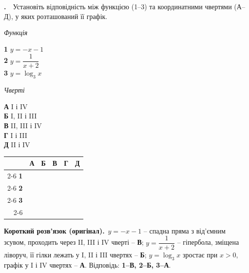 \documentclass[12pt]{article}
\newcommand{\matchingGrid}{%
    \begingroup
    \renewcommand{\arraystretch}{1.15}
    \setlength{\tabcolsep}{4pt}
    \footnotesize
    \begin{tabular}{r|c|c|c|c|c|}
         \multicolumn{1}{c}{} & \multicolumn{1}{c}{\textbf{А}} & \multicolumn{1}{c}{\textbf{Б}} & \multicolumn{1}{c}{\textbf{В}} & \multicolumn{1}{c}{\textbf{Г}} & \multicolumn{1}{c}{\textbf{Д}} \\ \cline{2-6}
         \textbf{1} & \phantom{X} & \phantom{X} & \phantom{X} & \phantom{X} & \phantom{X} \\ \cline{2-6}
         \textbf{2} & & & & & \\ \cline{2-6}
         \textbf{3} & & & & & \\ \cline{2-6}
    \end{tabular}
    \endgroup
}
\newcounter{zad}
\newcommand{\zadtask}[1]{\stepcounter{zad}\noindent\textbf{\thezad.}\ \ #1\par\vspace{0.2cm}}
\newcommand{\solution}[1]{%
\par\vspace{0.12cm}
\begin{tcolorbox}[colback=titleBg!45, colframe=mainGreen!55, boxrule=0.4pt, arc=2pt,
    left=6pt, right=6pt, top=3pt, bottom=3pt, breakable]
\footnotesize\textbf{Короткий розв'язок (оригінал).}\ #1
\end{tcolorbox}
\par\vspace{0.12cm}
}
\begin{document}
\zadtask{Установіть відповідність між функцією (1--3) та координатними чвертями (А--Д), у яких розташований її графік.

\vspace{0.3cm}
\noindent
\begin{minipage}[t]{0.4\textwidth}
\textit{Функція}\par\vspace{0.2cm}
\textbf{1} \quad $y = -x - 1$\\[0.4cm]
\textbf{2} \quad $y = \dfrac{1}{x+2}$\\[0.5cm]
\textbf{3} \quad $y = \log_3 x$
\end{minipage}
\hfill
\begin{minipage}[t]{0.32\textwidth}
\textit{Чверті}\par\vspace{0.2cm}
\textbf{А} \quad I і IV\\[0.15cm]
\textbf{Б} \quad I, II і III\\[0.15cm]
\textbf{В} \quad II, III і IV\\[0.15cm]
\textbf{Г} \quad I і III\\[0.15cm]
\textbf{Д} \quad II і IV
\end{minipage}
\hfill
\begin{minipage}[t]{0.2\textwidth}
\vspace{0.5cm}
\begin{flushright}\matchingGrid\end{flushright}
\end{minipage}
}
\solution{$y=-x-1$ -- спадна пряма з від'ємним зсувом, проходить через II, III і IV чверті -- \textbf{В}; $y=\dfrac{1}{x+2}$ -- гіпербола, зміщена ліворуч, її гілки лежать у I, II і III чвертях -- \textbf{Б}; $y=\log_3 x$ зростає при $x>0$, графік у I і IV чвертях -- \textbf{А}. Відповідь: \textbf{1--В, 2--Б, 3--А}.}
\end{document}
